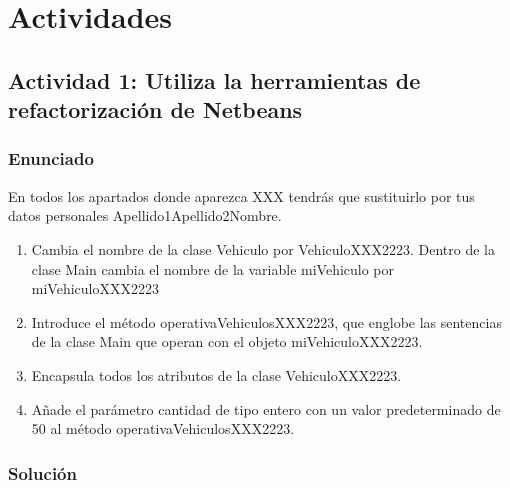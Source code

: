 \section{Actividades}

\subsection{Actividad 1: Utiliza la herramientas de refactorización de Netbeans}

\subsubsection{Enunciado}
En todos los apartados donde aparezca XXX tendrás que sustituirlo por tus datos personales Apellido1Apellido2Nombre.

\begin{enumerate}
    \item Cambia el nombre de la clase Vehiculo por VehiculoXXX2223. Dentro de la clase Main cambia el nombre de la variable miVehiculo por miVehiculoXXX2223
    \item Introduce el método operativaVehiculosXXX2223, que englobe las sentencias de la clase Main que operan con el objeto miVehiculoXXX2223.
    \item Encapsula todos los atributos de la clase VehiculoXXX2223.
    \item Añade el parámetro cantidad de tipo entero con un valor predeterminado de 50 al método operativaVehiculosXXX2223.
\end{enumerate}

\subsubsection{Solución}

